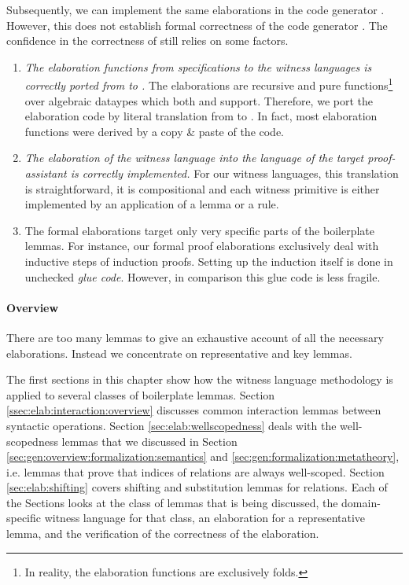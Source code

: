 Subsequently, we can implement the same elaborations in the code generator
\Needle. However, this does not establish formal correctness of the code
generator \Needle. The confidence in the correctness of \Needle still relies on
some factors.

\begin{enumerate}
\item \emph{The elaboration functions from \Knot specifications to the witness
  languages is correctly ported from \Coq to \Haskell.} The elaborations are
  recursive and pure functions\footnote{In reality, the elaboration functions
    are exclusively folds.} over algebraic dataypes which both \Coq and \Haskell
  support. Therefore, we port the elaboration code by literal translation from
  \Coq to \Haskell. In fact, most \Haskell elaboration functions were derived by
  a copy \& paste of the \Coq code.

\item \emph{The elaboration of the witness language into the language of the
  target proof-assistant is correctly implemented.} For our witness languages,
  this translation is straightforward, it is compositional and each witness
  primitive is either implemented by an application of a lemma or a rule.

\item The formal elaborations target only very specific parts of the boilerplate
  lemmas. For instance, our formal proof elaborations exclusively deal with
  inductive steps of induction proofs. Setting up the induction itself is done
  in unchecked \emph{glue code}. However, in comparison this glue code is less
  fragile.
\end{enumerate}



\paragraph{Overview}

There are too many lemmas to give an exhaustive account of all the
necessary elaborations. Instead we concentrate on representative and key lemmas.

The first sections in this chapter show how the witness language methodology is
applied to several classes of boilerplate lemmas. Section
\ref{ssec:elab:interaction:overview} discusses common interaction lemmas between
syntactic operations. Section \ref{sec:elab:wellscopedness} deals with the
well-scopedness lemmas that we discussed in Section
\ref{sec:gen:overview:formalization:semantics} and
\ref{sec:gen:formalization:metatheory}, i.e. lemmas that prove that indices of
relations are always well-scoped. Section \ref{sec:elab:shifting} covers
shifting and substitution lemmas for relations. Each of the Sections looks at
the class of lemmas that is being discussed, the domain-specific witness
language for that class, an elaboration for a representative lemma, and the
verification of the correctness of the elaboration.

